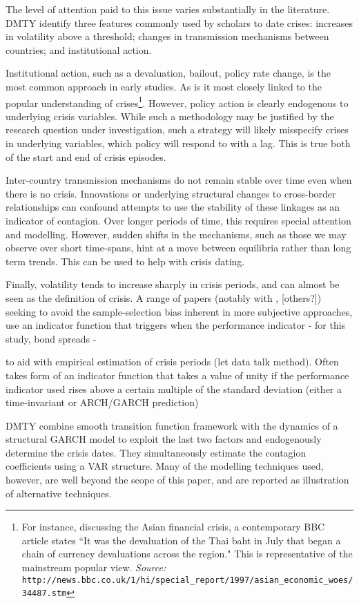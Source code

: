\documentclass[../base.tex]{subfiles}
\begin{document}
The level of attention paid to this issue varies substantially in the literature. DMTY identify three  features commonly used by scholars to date crises: increases in volatility above a threshold; changes in transmission mechanisms between countries; and institutional action.

Institutional action, such as a devaluation, bailout, policy rate change, is the most common approach in early studies. As is it most closely linked to the popular understanding of crises\footnote{For instance, discussing the Asian financial crisis, a contemporary BBC article states ``It was the devaluation of the Thai baht in July that began a chain of currency devaluations across the region." This is representative of the mainstream popular view.
	\textit{Source:} \texttt{http://news.bbc.co.uk/1/hi/special\_report/1997/asian\_economic\_woes/34487.stm}}. However, policy action is clearly endogenous to underlying crisis variables. While such a methodology may be justified by the research question under investigation, such a strategy will likely misspecify crises in underlying variables, which policy will respond to with a lag. This is true both of the start and end of crisis episodes. 

Inter-country transmission mechanisms do not remain stable over time even when there is no crisis. Innovations or underlying structural changes to cross-border relationships can confound attempts to use the stability of these linkages as an indicator of contagion. Over longer periods of time, this requires special attention and modelling. However, sudden shifts in the mechanisms, such as those we may observe over short time-spans, hint at a move between equilibria rather than long term trends. This can be used to help with crisis dating.

Finally, volatility tends to increase sharply in crisis periods, and can almost be seen as the definition of crisis. A range of papers (notably with \cite{eichengreen1996contagious}, [others?]) seeking to avoid the sample-selection bias inherent in more subjective approaches, use an indicator function that triggers when the performance indicator - for this study, bond spreads - 

to aid with empirical estimation of crisis periods (let data talk method). Often takes form of an indicator function that takes a value of unity if the performance indicator used rises above a certain multiple of the standard deviation (either a time-invariant or ARCH/GARCH prediction)

DMTY combine smooth transition function framework with the dynamics of a structural GARCH model to exploit the last two factors and endogenously determine the crisis dates. They simultaneously estimate the contagion coefficients using a VAR structure. Many of the modelling techniques used, however, are well beyond the scope of this paper, and are reported as illustration of alternative techniques.
\end{document}

